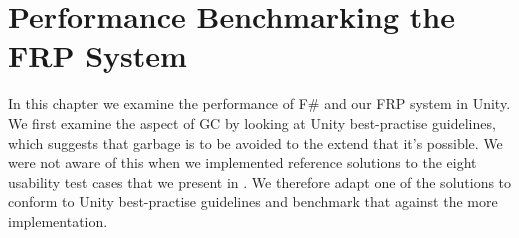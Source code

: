 \section{Performance Benchmarking the FRP System}
In this chapter we examine the performance of F\# and our \gls{FRP} system in Unity. We first examine the aspect of \gls{GC} by looking at Unity best-practise guidelines, which suggests that garbage is to be avoided to the extend that it's possible. We were not aware of this when we implemented reference solutions to the eight usability test cases that we present in . We therefore adapt one of the solutions to conform to Unity best-practise guidelines and benchmark that against the more  implementation.


